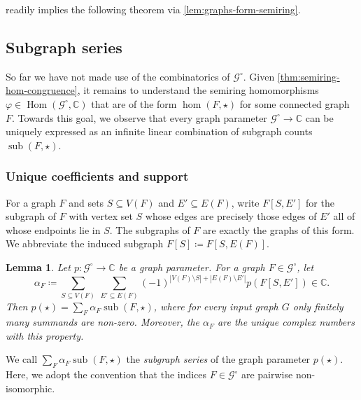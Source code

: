\documentclass[11pt]{scrartcl}
\theoremstyle{definition}
\theoremstyle{plain}
\newtheorem{lemma}[definition]{Lemma}
\theoremstyle{remark}
\renewcommand\phi\varphi
\DeclareMathOperator\Hom{Hom}
\DeclareMathOperator{\sub}{sub}
\newcommand{\lG}{\mathcal{G}^\circ}
\begin{document}
	 readily implies the following theorem via \cref{lem:graphs-form-semiring}.
	\thmPhi*

	\subsection{Subgraph series}
	\label{sec:subgraph-series}

	So far we have not made use of the combinatorics of $\lG$.
	Given \cref{thm:semiring-hom-congruence},
	it remains to understand the semiring homomorphisms $\phi \in \Hom(\lG, \mathbb{C})$ that are of the form $\hom(F, \star)$ for some connected graph $F$.
	Towards this goal,
	we observe that every graph parameter $\lG \to \mathbb{C}$
	can be uniquely expressed as an infinite linear combination of subgraph counts $\sub(F, \star)$.



	\subsubsection{Unique coefficients and support}
	\label{sec:unique-coefficients}

	For a graph $F$ and sets $S \subseteq V(F)$ and $E' \subseteq E(F)$,
	write $F[S, E']$ for the subgraph of $F$ with vertex set $S$
	whose edges are precisely those edges of $E'$ all of whose endpoints lie in $S$.
	The subgraphs of $F$ are exactly the graphs of this form.
	We abbreviate the induced subgraph $F[S] \coloneqq F[S, E(F)]$.

	\begin{lemma}\label{lem:unique-subgraph-series}
		Let $p \colon \lG \to \mathbb{C}$ be a graph parameter.
		For a graph $F \in \lG$, let
		\[
			\alpha_F \coloneqq \sum_{S \subseteq V(F)} \ \sum_{E' \subseteq E(F)} (-1)^{|V(F) \setminus S| + |E(F) \setminus E'|}  p(F[S, E']) \in \mathbb{C}.
		\]
		Then $p(\star) = \sum_F \alpha_F \sub(F, \star)$,
		where for every input graph $G$ only finitely many summands are non-zero.
		Moreover, the $\alpha_F$ are the unique complex numbers with this property.
	\end{lemma}

	We call $\sum_F \alpha_F \sub(F, \star)$ the \emph{subgraph series} of the graph parameter $p(\star)$.
	Here, we adopt the convention that the indices $F \in \lG$ are pairwise non-isomorphic.
\end{document}
